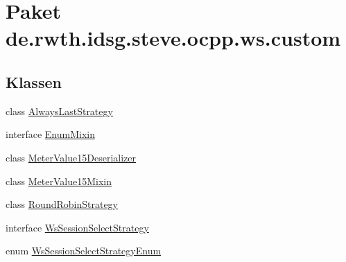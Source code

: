 \hypertarget{namespacede_1_1rwth_1_1idsg_1_1steve_1_1ocpp_1_1ws_1_1custom}{\section{Paket de.\-rwth.\-idsg.\-steve.\-ocpp.\-ws.\-custom}
\label{namespacede_1_1rwth_1_1idsg_1_1steve_1_1ocpp_1_1ws_1_1custom}
}
\subsection*{Klassen}
\begin{DoxyCompactItemize}
\item 
class \hyperlink{classde_1_1rwth_1_1idsg_1_1steve_1_1ocpp_1_1ws_1_1custom_1_1_always_last_strategy}{Always\-Last\-Strategy}
\item 
interface \hyperlink{interfacede_1_1rwth_1_1idsg_1_1steve_1_1ocpp_1_1ws_1_1custom_1_1_enum_mixin}{Enum\-Mixin}
\item 
class \hyperlink{classde_1_1rwth_1_1idsg_1_1steve_1_1ocpp_1_1ws_1_1custom_1_1_meter_value15_deserializer}{Meter\-Value15\-Deserializer}
\item 
class \hyperlink{classde_1_1rwth_1_1idsg_1_1steve_1_1ocpp_1_1ws_1_1custom_1_1_meter_value15_mixin}{Meter\-Value15\-Mixin}
\item 
class \hyperlink{classde_1_1rwth_1_1idsg_1_1steve_1_1ocpp_1_1ws_1_1custom_1_1_round_robin_strategy}{Round\-Robin\-Strategy}
\item 
interface \hyperlink{interfacede_1_1rwth_1_1idsg_1_1steve_1_1ocpp_1_1ws_1_1custom_1_1_ws_session_select_strategy}{Ws\-Session\-Select\-Strategy}
\item 
enum \hyperlink{enumde_1_1rwth_1_1idsg_1_1steve_1_1ocpp_1_1ws_1_1custom_1_1_ws_session_select_strategy_enum}{Ws\-Session\-Select\-Strategy\-Enum}
\end{DoxyCompactItemize}
